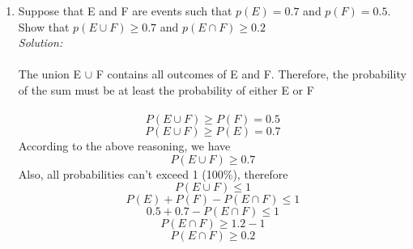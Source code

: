 \documentclass[a4paper]{article}
\begin{document}
\begin{enumerate}
	      \textit{Solutions:}\\
	      \begin{math}
		      P(A \cup B \cup C) \newline 
		      = P(A \cup B) + P(C) - P((A \cup B)\cap C))
		      \newline
		      =P(A \cup B) + P(C) - P((A\cap C) \cup (B\cap C))
		      \newline
		      =P(A) +P(B) - P(A \cap B) + P(C) - ( P(A \cap C) + P(B \cap C) - P(A \cap B \cap C) )
		      \newline
		      =P(A) + P(B) + P(C) - P(A \cap B) - P(B \cap C) - P(A \cap C) + P(A \cap B \cap C)
	      \end{math}
	\item Suppose that E and F are events such that $p(E) = 0.7$ and $p(F) = 0.5$. Show that $p(E \cup F) \geq 0.7$ and $p(E \cap F) \geq 0.2$\\
	      \textit{Solution:}\\\\
	      The union E $\cup$ F contains all outcomes of E and F.
	      Therefore, the probability of the sum must be at least the probability of either E or F\\\\
	      \begin{equation*}
		      P(E\cup F) \geq P(F) = 0.5
	      \end{equation*}
	      \begin{equation*}
		      P(E\cup F) \geq P(E) = 0.7
	      \end{equation*}
	      According to the above reasoning, we have 
	      \begin{equation*}
		      P(E\cup F) \geq 0.7
	      \end{equation*}
	      Also, all probabilities can't exceed 1 (100\%), therefore\\
	      \begin{equation*}
		      P(E\cup F) \leq 1
	      \end{equation*}
	      \begin{equation*}
		      P(E) + P(F) - P(E \cap F) \leq 1
	      \end{equation*}
	      \begin{equation*}
		      0.5 + 0.7 - P(E \cap F) \leq 1
	      \end{equation*}
	      \begin{equation*}
		      P(E \cap F) \geq 1.2 - 1 
	      \end{equation*}
	      \begin{equation*}
		      P(E \cap F) \geq 0.2
	      \end{equation*}
	      
\end{enumerate}
\end{document}
